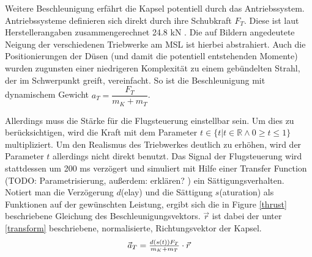 Weitere Beschleunigung erfährt die Kapsel potentiell durch das Antriebssystem. Antriebssysteme definieren sich direkt durch ihre Schubkraft $F_T$. Diese ist laut Herstellerangaben zusammengerechnet 24.8 kN \cite{AerojetRocketdyne2012} \cite{AerojetRocketdyne}. Die auf Bildern angedeutete Neigung der verschiedenen Triebwerke am MSL ist hierbei abstrahiert. Auch die Positionierungen der Düsen (und damit die potentiell entstehenden Momente) wurden zugunsten einer niedrigeren Komplexität zu einem gebündelten Strahl, der im Schwerpunkt greift, vereinfacht. So ist die Beschleunigung mit dynamischem Gewicht  $ a_T = \dfrac{F_T}{m_K + m_T}$.

Allerdings muss die Stärke für die Flugsteuerung einstellbar sein. Um dies zu berücksichtigen, wird die Kraft mit dem Parameter $t \in \{t | t \in \mathbb{R} \land 0 \geq t \leq 1\}$ multipliziert. Um den Realismus des Triebwerkes deutlich zu erhöhen, wird der Parameter $t$ allerdings nicht direkt benutzt. Das Signal der Flugsteuerung wird stattdessen um 200 ms verzögert und simuliert mit Hilfe einer Transfer Function (TODO: Parametrisierung, außerdem: erklären? ) ein Sättigungsverhalten. Notiert man die Verzögerung $d$(elay) und die Sättigung $s$(aturation) als Funktionen auf der gewünschten Leistung, ergibt sich die in Figure \ref{thrust} beschriebene Gleichung des Beschleunigungsvektors. $\vec r$ ist dabei der unter \ref{transform} beschriebene, normalisierte, Richtungsvektor der Kapsel.
\begin{equation}
	$$\vec a_{T} = \frac{d(s(t))F_T}{m_K + m_T} \cdot \vec r$$\\
\end{equation}
